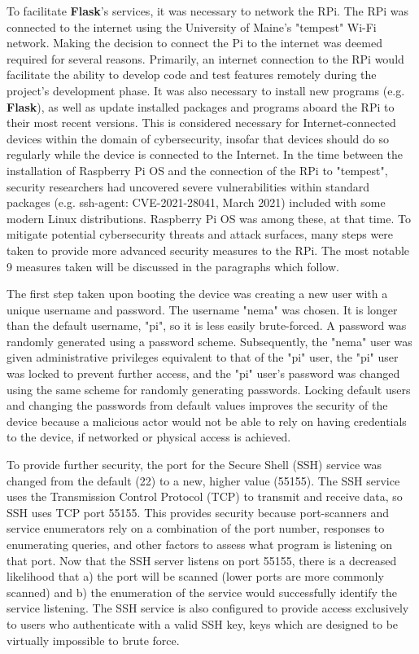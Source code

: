 \documentclass[11pt]{article}
\begin{document}
To facilitate \textbf{Flask}'s services, it was necessary to network the RPi. 
The RPi was connected to the internet using the University of Maine's "tempest" Wi-Fi network. 
Making the decision to connect the Pi to the internet was deemed required for several reasons. 
Primarily, an internet connection to the RPi would facilitate the ability to develop code and test features remotely during the project's development phase. 
It was also necessary to install new programs (e.g. \textbf{Flask}), as well as update installed packages and programs aboard the RPi to their most recent versions.
This is considered necessary for Internet-connected devices within the domain of cybersecurity, insofar that devices should do so regularly while the device is connected to the Internet. 
In the time between the installation of Raspberry Pi OS and the connection of the RPi to "tempest", security researchers had uncovered severe vulnerabilities within standard packages (e.g. ssh-agent: CVE-2021-28041, March 2021) included with some modern Linux distributions.
Raspberry Pi OS was among these, at that time.
To mitigate potential cybersecurity threats and attack surfaces, many steps were taken to provide more advanced security measures to the RPi.
The most notable 9 measures taken will be discussed in the paragraphs which follow.

The first step taken upon booting the device was creating a new user with a unique username and password. 
The username "nema" was chosen. 
It is longer than the default username, "pi", so it is less easily brute-forced. 
A password was randomly generated using a password scheme. 
Subsequently, the "nema" user was given administrative privileges equivalent to that of the "pi" user, the "pi" user was locked to prevent further access, and the "pi" user's password was changed using the same scheme for randomly generating passwords.
Locking default users and changing the passwords from default values improves the security of the device because a malicious actor would not be able to rely on having credentials to the device, if networked or physical access is achieved.

To provide further security, the port for the Secure Shell (SSH) service was changed from the default (22) to a new, higher value (55155). 
The SSH service uses the Transmission Control Protocol (TCP) to transmit and receive data, so SSH uses TCP port 55155. %
This provides security because port-scanners and service enumerators rely on a combination of the port number, responses to enumerating queries, and other factors to assess what program is listening on that port. 
Now that the SSH server listens on port 55155, there is a decreased likelihood that a) the port will be scanned (lower ports are more commonly scanned) and b) the enumeration of the service would successfully identify the service listening. 
The SSH service is also configured to provide access exclusively to users who authenticate with a valid SSH key, keys which are designed to be virtually impossible to brute force.
\end{document}
